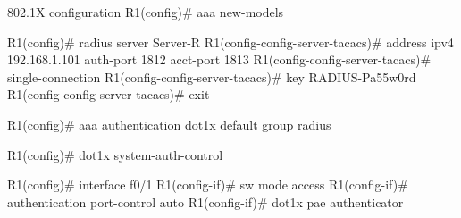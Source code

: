 \begin{sexylisting}{802.1X configuration}
R1(config)# aaa new-models

R1(config)# radius server Server-R
R1(config-config-server-tacacs)# address ipv4 192.168.1.101 auth-port 1812 acct-port 1813
R1(config-config-server-tacacs)# single-connection
R1(config-config-server-tacacs)# key RADIUS-Pa55w0rd
R1(config-config-server-tacacs)# exit
 
R1(config)# aaa authentication dot1x default group radius

R1(config)# dot1x system-auth-control

R1(config)# interface f0/1
R1(config-if)# sw mode access
R1(config-if)# authentication port-control auto
R1(config-if)# dot1x pae authenticator
\end{sexylisting}